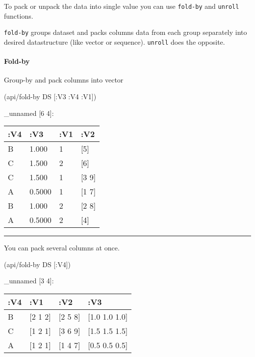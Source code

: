 \documentclass[]{article}
\newenvironment{Shaded}{\begin{snugshade}}{\end{snugshade}}
\newcommand{\AttributeTok}[1]{\textcolor[rgb]{0.77,0.63,0.00}{#1}}
\newcommand{\NormalTok}[1]{#1}
\let\oldparagraph\paragraph
\renewcommand{\paragraph}[1]{\oldparagraph{#1}\mbox{}}
\begin{document}
To pack or unpack the data into single value you can use
\texttt{fold-by} and \texttt{unroll} functions.

\texttt{fold-by} groups dataset and packs columns data from each group
separately into desired datastructure (like vector or sequence).
\texttt{unroll} does the opposite.

\paragraph{Fold-by}\label{fold-by}

Group-by and pack columns into vector

\begin{Shaded}
\begin{Highlighting}[]
\NormalTok{(api/fold-by DS [}\AttributeTok{:V3} \AttributeTok{:V4} \AttributeTok{:V1}\NormalTok{])}
\end{Highlighting}
\end{Shaded}

\_unnamed {[}6 4{]}:

\begin{longtable}[]{@{}llll@{}}
\toprule
:V4 & :V3 & :V1 & :V2\tabularnewline
\midrule
\endhead
B & 1.000 & 1 & {[}5{]}\tabularnewline
C & 1.500 & 2 & {[}6{]}\tabularnewline
C & 1.500 & 1 & {[}3 9{]}\tabularnewline
A & 0.5000 & 1 & {[}1 7{]}\tabularnewline
B & 1.000 & 2 & {[}2 8{]}\tabularnewline
A & 0.5000 & 2 & {[}4{]}\tabularnewline
\bottomrule
\end{longtable}

\begin{center}\rule{0.5\linewidth}{0.5pt}\end{center}

You can pack several columns at once.

\begin{Shaded}
\begin{Highlighting}[]
\NormalTok{(api/fold-by DS [}\AttributeTok{:V4}\NormalTok{])}
\end{Highlighting}
\end{Shaded}

\_unnamed {[}3 4{]}:

\begin{longtable}[]{@{}llll@{}}
\toprule
:V4 & :V1 & :V2 & :V3\tabularnewline
\midrule
\endhead
B & {[}2 1 2{]} & {[}2 5 8{]} & {[}1.0 1.0 1.0{]}\tabularnewline
C & {[}1 2 1{]} & {[}3 6 9{]} & {[}1.5 1.5 1.5{]}\tabularnewline
A & {[}1 2 1{]} & {[}1 4 7{]} & {[}0.5 0.5 0.5{]}\tabularnewline
\bottomrule
\end{longtable}
\end{document}
